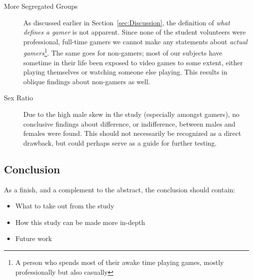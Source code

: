 \documentclass[runningheads,a4paper,oribibl]{llncs}
\begin{document}
\begin{description}
	\item[More Segregated Groups] As discussed earlier in Section~\ref{sec:Discussion}, the definition of \emph{what defines a gamer} is not apparent. Since none of the student volunteers were professional, full-time gamers we cannot make any statements about \emph{actual gamers}\footnote{A person who spends most of their awake time playing games, mostly professionally but also casually}. The same goes for non-gamers; most of our subjects have sometime in their life been exposed to video games to some extent, either playing themselves or watching someone else playing. This results in oblique findings about non-gamers as well.

	\item[Sex Ratio] Due to the high male skew in the study (especially amongst gamers), no conclusive findings about difference, or indifference, between males and females were found. This should not necessarily be recognized as a direct drawback, but could perhaps serve as a guide for further testing.
\end{description}




\subsection{Conclusion}
As a finish, and a complement to the abstract, the conclusion should contain:
\begin{itemize}
	\item What to take out from the study
	\item How this study can be made more in-depth
	\item Future work
\end{itemize}











\end{document}
